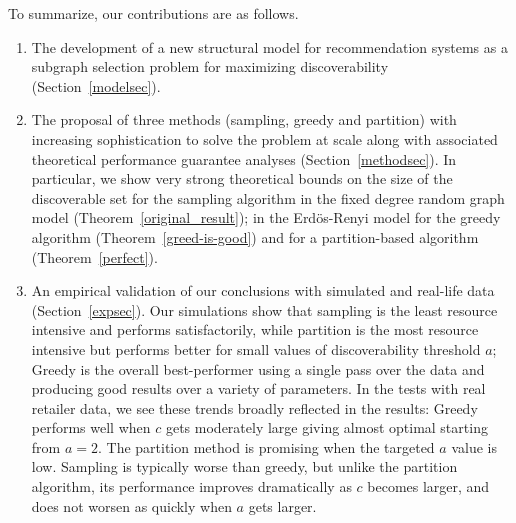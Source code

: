 To summarize, our contributions are as follows.
\begin{enumerate}
\item The development of a new structural model for recommendation systems as a subgraph selection problem for maximizing discoverability (Section~\ref{modelsec}).
\item The proposal of three methods (sampling, greedy and partition) with increasing sophistication to solve the problem at scale along with associated theoretical performance guarantee analyses (Section~\ref{methodsec}). In particular, we show very strong theoretical bounds on the size of the discoverable set for the sampling algorithm in the fixed degree random graph model (Theorem~\ref{original_result}); in the Erd\"os-Renyi model for the greedy algorithm (Theorem~\ref{greed-is-good}) and for a partition-based algorithm (Theorem~\ref{perfect}).
\item An empirical validation of our conclusions with simulated and real-life data (Section~\ref{expsec}). Our simulations show that sampling is the least resource intensive and performs satisfactorily, while partition is the most resource intensive but performs better for small values of discoverability threshold $a$; Greedy is the overall best-performer using a single pass over the data and producing good results over a variety of parameters. In the tests with real retailer data, we see these trends broadly reflected in the results: Greedy performs well when $c$ gets moderately large giving almost optimal starting from $a=2$. The partition method is promising when the targeted $a$ value is low. Sampling is typically worse than greedy, but unlike the partition algorithm, its performance improves dramatically as $c$ becomes larger, and does not worsen as quickly when $a$ gets larger.
\end{enumerate}
